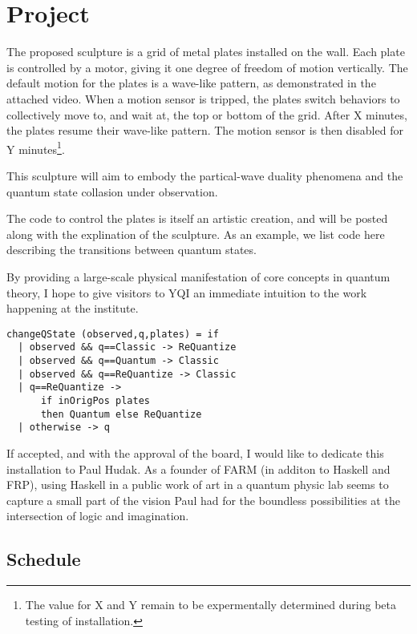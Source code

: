 \section{Project}

The proposed sculpture is a grid of metal plates installed on the wall.
Each plate is controlled by a motor, giving it one degree of freedom of motion vertically.
The default motion for the plates is a wave-like pattern, as demonstrated in the attached video.
When a motion sensor is tripped, the plates switch behaviors to collectively move to, and wait at, the top or bottom of the grid.
After X minutes, the plates resume their wave-like pattern. 
The motion sensor is then disabled for Y minutes\footnote{The value for X and Y remain to be expermentally determined during beta testing of installation.}.

This sculpture will aim to embody the partical-wave duality phenomena and the quantum state collasion under observation.



The code to control the plates is itself an artistic creation, and will be posted along with the explination of the sculpture.
As an example, we list code here describing the transitions between quantum states.

By providing a large-scale physical manifestation of core concepts in quantum theory, I hope to give visitors to YQI an immediate intuition to the work happening at the institute.

\begin{lstlisting}
changeQState (observed,q,plates) = if
  | observed && q==Classic -> ReQuantize
  | observed && q==Quantum -> Classic
  | observed && q==ReQuantize -> Classic
  | q==ReQuantize -> 
      if inOrigPos plates 
      then Quantum else ReQuantize
  | otherwise -> q

\end{lstlisting}


If accepted, and with the approval of the board, I would like to dedicate this installation to Paul Hudak.
As a founder of FARM (in additon to Haskell and FRP), using Haskell in a public work of art in a quantum physic lab seems to capture a small part of the vision Paul had for the boundless possibilities at the intersection of logic and imagination.

\subsection{Schedule}

